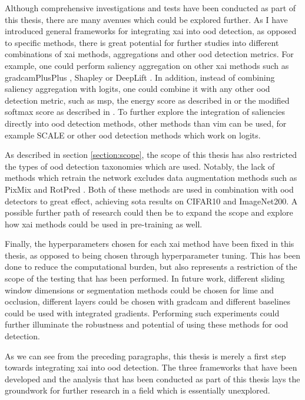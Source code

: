\documentclass[UKenglish]{uiomasterthesis} %
\theoremstyle{definition}
\begin{document}
Although comprehensive investigations and tests have been conducted as part of this thesis, there are many avenues which could be explored further. As I have introduced general frameworks for integrating \ac{xai} into \ac{ood} detection, as opposed to specific methods, there is great potential for further studies into different combinations of \ac{xai} methods, aggregations and other \ac{ood} detection metrics. For example, one could perform saliency aggregation on other \ac{xai} methods such as \ac{gradcam}PlusPlus \cite{gradcamplusplus}, Shapley \cite{shapley} or DeepLift \cite{deeplift}. In addition, instead of combining saliency aggregation with logits, one could combine it with any other \ac{ood} detection metric, such as \ac{msp}, the energy score as described in \cite{energy} or the modified softmax score as described in \cite{odin}. To further explore the integration of saliencies directly into \ac{ood} detection methods, other methods than \ac{vim} can be used, for example SCALE \cite{scale} or other \ac{ood} detection methods which work on logits.

As described in section \ref{section:scope}, the scope of this thesis has also restricted the types of \ac{ood} detection taxonomies which are used. Notably, the lack of methods which retrain the network excludes data augmentation methods such as PixMix \cite{pixmix} and RotPred \cite{rotpred}. Both of these methods are used in combination with \ac{ood} detectors to great effect, achieving \ac{sota} results on CIFAR10 and ImageNet200. A possible further path of research could then be to expand the scope and explore how \ac{xai} methods could be used in pre-training as well.

Finally, the hyperparameters chosen for each \ac{xai} method have been fixed in this thesis, as opposed to being chosen through hyperparameter tuning. This has been done to reduce the computational burden, but also represents a restriction of the scope of the testing that has been performed. In future work, different sliding window dimensions or segmentation methods could be chosen for \ac{lime} and occlusion, different layers could be chosen with \ac{gradcam} and different baselines could be used with integrated gradients. Performing such experiments could further illuminate the robustness and potential of using these methods for \ac{ood} detection.

As we can see from the preceding paragraphs, this thesis is merely a first step towards integrating \ac{xai} into \ac{ood} detection. The three frameworks that have been developed and the analysis that has been conducted as part of this thesis lays the groundwork for further research in a field which is essentially unexplored.

\backmatter{}
\printbibliography{}
\end{document}
